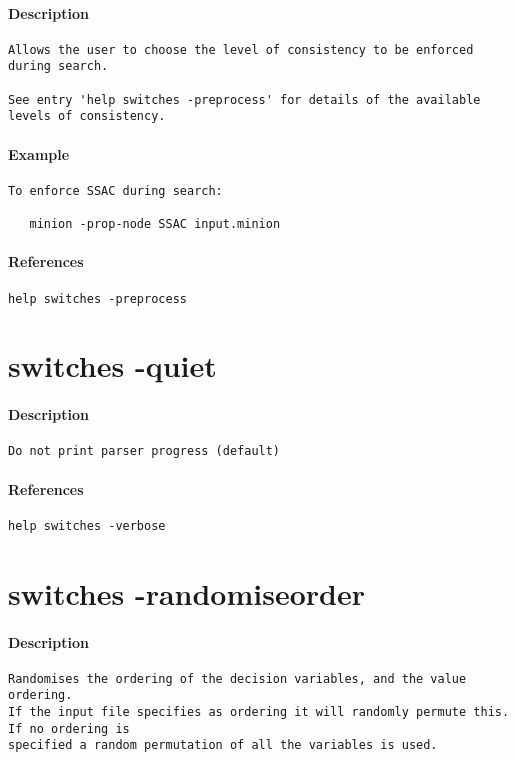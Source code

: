 \paragraph{Description}
{\footnotesize
\begin{verbatim}
Allows the user to choose the level of consistency to be enforced
during search.

See entry 'help switches -preprocess' for details of the available
levels of consistency.
\end{verbatim}
}
\paragraph{Example}
{\footnotesize
\begin{verbatim}
To enforce SSAC during search:

   minion -prop-node SSAC input.minion
\end{verbatim}
}
\paragraph{References}
{\footnotesize
\begin{verbatim}
help switches -preprocess
\end{verbatim}
}
\section{switches -quiet}
\paragraph{Description}
{\footnotesize
\begin{verbatim}
Do not print parser progress (default)
\end{verbatim}
}
\paragraph{References}
{\footnotesize
\begin{verbatim}
help switches -verbose
\end{verbatim}
}
\section{switches -randomiseorder}
\paragraph{Description}
{\footnotesize
\begin{verbatim}
Randomises the ordering of the decision variables, and the value ordering.
If the input file specifies as ordering it will randomly permute this. If no ordering is
specified a random permutation of all the variables is used.
\end{verbatim}
}
